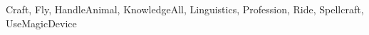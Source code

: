 \def\SummonerBAB{a}
\def\SummonerFort{p}
\def\SummonerRef{p}
\def\SummonerWill{g}
\edef\SummonerClassSkillsList{}{\forcsvlist\listadd{\SummonerClassSkillsList}}{Craft, Fly, HandleAnimal, KnowledgeAll, Linguistics, Profession, Ride, Spellcraft, UseMagicDevice}